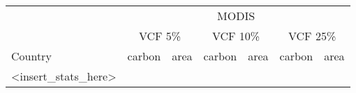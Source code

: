 \documentclass[10pt]{article}
\begin{document}
\begin{tabular}{lllllll}  %

\toprule

& \multicolumn{6}{c}{MODIS} \\
& \multicolumn{2}{c}{VCF 5\%} & \multicolumn{2}{c}{VCF 10\%} & \multicolumn{2}{c}{VCF 25\%} \\
\cmidrule(lr){2-7}
Country & carbon & area & carbon & area & carbon & area \\
\cmidrule{1-7}

<insert_stats_here>


\bottomrule
\end{tabular}
\end{document}
